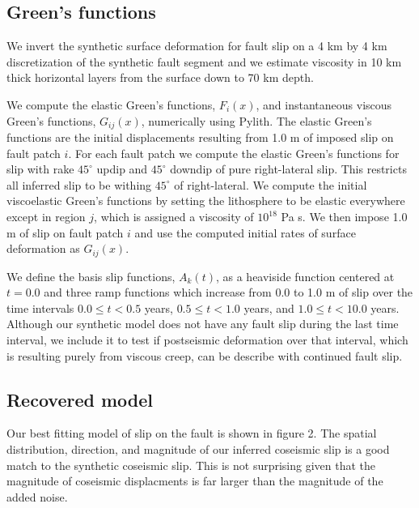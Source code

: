 \documentclass[fleqn,12pt]{article}
\begin{document}
\subsection{Green's functions}

We invert the synthetic surface deformation for fault slip on a 4 km
by 4 km discretization of the synthetic fault segment and we estimate
viscosity in 10 km thick horizontal layers from the surface down to 70
km depth.

We compute the elastic Green's functions, $F_i(x)$, and instantaneous
viscous Green's functions, $G_{ij}(x)$, numerically using Pylith.  The
elastic Green’s functions are the initial displacements resulting from
1.0 m of imposed slip on fault patch $i$.  For each fault patch we
compute the elastic Green's functions for slip with rake $45^\circ$
updip and $45^\circ$ downdip of pure right-lateral slip.  This
restricts all inferred slip to be withing $45^\circ$ of
right-lateral. We compute the initial viscoelastic Green's functions
by setting the lithosphere to be elastic everywhere except in region
$j$, which is assigned a viscosity of $10^{18}$ Pa s.  We then impose
1.0 m of slip on fault patch $i$ and use the computed initial
rates of surface deformation as $G_{ij}(x)$.

We define the basis slip functions, $A_k(t)$, as a heaviside function
centered at $t=0.0$ and three ramp functions which increase from 0.0 to
1.0 m of slip over the time intervals $0.0\leq t < 0.5$ years,
$0.5\leq t < 1.0$ years, and $1.0\leq t < 10.0$ years.  Although our
synthetic model does not have any fault slip during the last time
interval, we include it to test if postseismic deformation over that
interval, which is resulting purely from viscous creep, can be
describe with continued fault slip.

\subsection{Recovered model}

Our best fitting model of slip on the fault is shown in figure 2.  The
spatial distribution, direction, and magnitude of our inferred
coseismic slip is a good match to the synthetic coseismic slip.  This
is not surprising given that the magnitude of coseismic displacments
is far larger than the magnitude of the added noise. 
\end{document}
